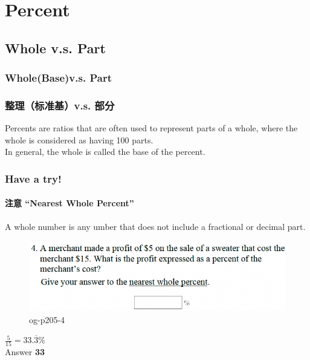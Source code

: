 \documentclass[
	11pt, %
	handout,
]{beamer}
\begin{document}

\section{Percent}

\subsection{Whole v.s. Part}

\begin{frame}
	\frametitle{Whole(Base)v.s. Part}
	\frametitle{整理（标准基）v.s. 部分}
	\begin{definition}
		Percents are ratios that are often used to represent parts of a \alert{whole}, where the whole is considered as having 100 \alert{parts}. \\
		In general, the whole is called the \alert{base} of the percent.
	\end{definition}
	
\end{frame}


\begin{frame}
	\frametitle{Have a try!}
	\framesubtitle{注意 “Nearest Whole Percent”}

	\begin{definition}
		A whole number is any umber that does not include a fractional or decimal part.
	\end{definition}

	\begin{figure}
		\includegraphics[width=\linewidth]{Percent_Example_Question_2.png}
		\caption{og-p205-4}
	\end{figure}
	\pause
$\frac{5}{15} = 33.\overline{3} \%$ \\

\pause
\bigskip
Answer \textbf{33}
\end{frame}

\end{document}
